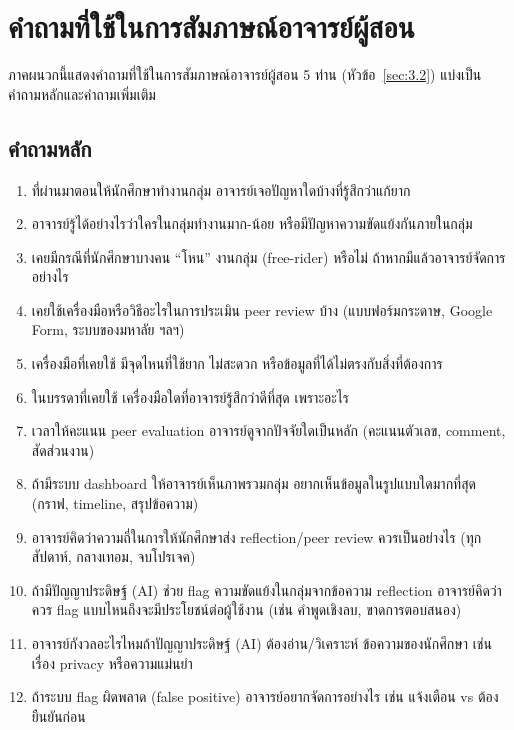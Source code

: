 \chapter{คำถามที่ใช้ในการสัมภาษณ์อาจารย์ผู้สอน}\label{app:interview}

ภาคผนวกนี้แสดงคำถามที่ใช้ในการสัมภาษณ์อาจารย์ผู้สอน 5 ท่าน (หัวข้อ~\ref{sec:3.2}) แบ่งเป็นคำถามหลักและคำถามเพิ่มเติม

\section{คำถามหลัก}
\begin{enumerate}
  \item ที่ผ่านมาตอนให้นักศึกษาทำงานกลุ่ม อาจารย์เจอปัญหาใดบ้างที่รู้สึกว่าแก้ยาก
  \item อาจารย์รู้ได้อย่างไรว่าใครในกลุ่มทำงานมาก-น้อย หรือมีปัญหาความขัดแย้งกันภายในกลุ่ม
  \item เคยมีกรณีที่นักศึกษาบางคน ``โหน'' งานกลุ่ม (free-rider) หรือไม่ ถ้าหากมีแล้วอาจารย์จัดการอย่างไร
  \item เคยใช้เครื่องมือหรือวิธีอะไรในการประเมิน peer review บ้าง (แบบฟอร์มกระดาษ, Google Form, ระบบของมหาลัย ฯลฯ)
  \item เครื่องมือที่เคยใช้ มีจุดไหนที่ใช้ยาก ไม่สะดวก หรือข้อมูลที่ได้ไม่ตรงกับสิ่งที่ต้องการ
  \item ในบรรดาที่เคยใช้ เครื่องมือใดที่อาจารย์รู้สึกว่าดีที่สุด เพราะอะไร
  \item เวลาให้คะแนน peer evaluation อาจารย์ดูจากปัจจัยใดเป็นหลัก (คะแนนตัวเลข, comment, สัดส่วนงาน)
  \item ถ้ามีระบบ dashboard ให้อาจารย์เห็นภาพรวมกลุ่ม อยากเห็นข้อมูลในรูปแบบใดมากที่สุด (กราฟ, timeline, สรุปข้อความ)
  \item อาจารย์คิดว่าความถี่ในการให้นักศึกษาส่ง reflection/peer review ควรเป็นอย่างไร (ทุกสัปดาห์, กลางเทอม, จบโปรเจค)
  \item ถ้ามีปัญญาประดิษฐ์ (AI) ช่วย flag ความขัดแย้งในกลุ่มจากข้อความ reflection อาจารย์คิดว่าควร flag แบบไหนถึงจะมีประโยชน์ต่อผู้ใช้งาน (เช่น คำพูดเชิงลบ, ขาดการตอบสนอง)
  \item อาจารย์กังวลอะไรไหมถ้าปัญญาประดิษฐ์ (AI) ต้องอ่าน/วิเคราะห์ ข้อความของนักศึกษา เช่น เรื่อง privacy หรือความแม่นยำ
  \item ถ้าระบบ flag ผิดพลาด (false positive) อาจารย์อยากจัดการอย่างไร เช่น แจ้งเตือน vs ต้องยืนยันก่อน
\end{enumerate}

